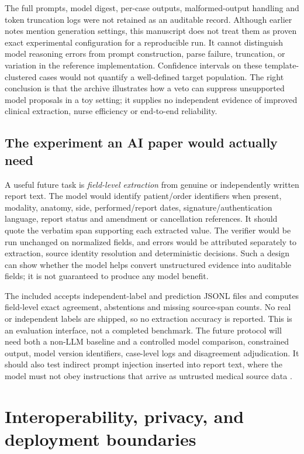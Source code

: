 \documentclass[11pt,twocolumn]{article}
\begin{document}
The full prompts, model digest, per-case outputs, malformed-output handling and token truncation logs were not retained as an auditable record. Although earlier notes mention generation settings, this manuscript does not treat them as proven exact experimental configuration for a reproducible run. It cannot distinguish model reasoning errors from prompt construction, parse failure, truncation, or variation in the reference implementation. Confidence intervals on these template-clustered cases would not quantify a well-defined target population. The right conclusion is that the archive illustrates how a veto can suppress unsupported model proposals in a toy setting; it supplies no independent evidence of improved clinical extraction, nurse efficiency or end-to-end reliability.

\subsection{The experiment an AI paper would actually need}
A useful future task is \emph{field-level extraction} from genuine or independently written report text. The model would identify patient/order identifiers when present, modality, anatomy, side, performed/report dates, signature/authentication language, report status and amendment or cancellation references. It should quote the verbatim span supporting each extracted value. The verifier would be run unchanged on normalized fields, and errors would be attributed separately to extraction, source identity resolution and deterministic decisions. Such a design can show whether the model helps convert unstructured evidence into auditable fields; it is not guaranteed to produce any model benefit.

The included  accepts independent-label and prediction JSONL files and computes field-level exact agreement, abstentions and missing source-span counts. No real or independent labels are shipped, so no extraction accuracy is reported. This is an evaluation interface, not a completed benchmark. The future protocol will need both a non-LLM baseline and a controlled model comparison, constrained output, model version identifiers, case-level logs and disagreement adjudication. It should also test indirect prompt injection inserted into report text, where the model must not obey instructions that arrive as untrusted medical source data \cite{greshake2023,nistaimrf2023}.

\section{Interoperability, privacy, and deployment boundaries}\label{sec:domain}
\end{document}
